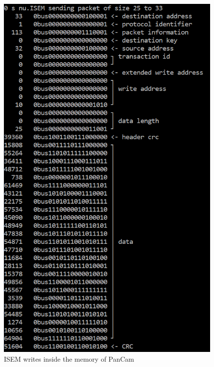 \documentclass[12pt,a4paper]{article}
\begin{document}
\begin{figure}[h]
	\centering
    \includegraphics[scale = 0.5]{results/ISEM_write.png}
    \caption{ISEM writes inside the memory of PanCam}
\end{figure}

\pagebreak
\end{document}
